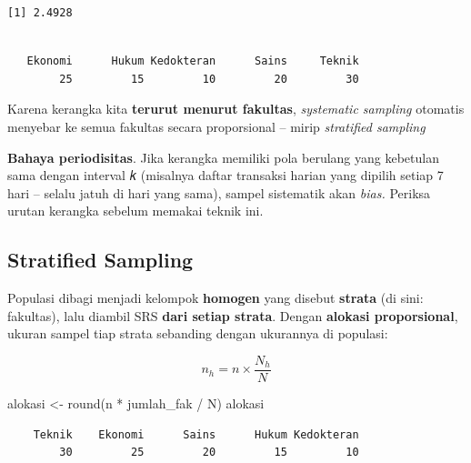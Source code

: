 \documentclass[
  indonesian,
  letterpaper,
]{book}
\newenvironment{Shaded}{\begin{snugshade}}{\end{snugshade}}
\newcommand{\FunctionTok}[1]{\textcolor[rgb]{0.28,0.35,0.67}{#1}}
\newcommand{\NormalTok}[1]{\textcolor[rgb]{0.00,0.23,0.31}{#1}}
\newcommand{\OtherTok}[1]{\textcolor[rgb]{0.00,0.23,0.31}{#1}}
\newcommand{\SpecialCharTok}[1]{\textcolor[rgb]{0.37,0.37,0.37}{#1}}
\begin{document}
\begin{verbatim}
[1] 2.4928
\end{verbatim}

\begin{Shaded}
\end{Shaded}

\begin{verbatim}

   Ekonomi      Hukum Kedokteran      Sains     Teknik 
        25         15         10         20         30 
\end{verbatim}

Karena kerangka kita \textbf{terurut menurut fakultas}, \emph{systematic
sampling} otomatis menyebar ke semua fakultas secara proporsional --
mirip \emph{stratified sampling}

\textbf{Bahaya periodisitas}. Jika kerangka memiliki pola berulang yang
kebetulan sama dengan interval 𝑘 (misalnya daftar transaksi harian yang
dipilih setiap 7 hari -- selalu jatuh di hari yang sama), sampel
sistematik akan \emph{bias.} Periksa urutan kerangka sebelum memakai
teknik ini.

\subsection{Stratified Sampling}\label{stratified-sampling}

Populasi dibagi menjadi kelompok \textbf{homogen} yang disebut
\textbf{strata} (di sini: fakultas), lalu diambil SRS \textbf{dari
setiap strata}. Dengan \textbf{alokasi proporsional}, ukuran sampel tiap
strata sebanding dengan ukurannya di populasi:

\[n_h = n \times \frac{N_h}{N}\]

\begin{Shaded}
\begin{Highlighting}[]
\NormalTok{alokasi }\OtherTok{\textless{}{-}} \FunctionTok{round}\NormalTok{(n }\SpecialCharTok{*}\NormalTok{ jumlah\_fak }\SpecialCharTok{/}\NormalTok{ N)}
\NormalTok{alokasi}
\end{Highlighting}
\end{Shaded}

\begin{verbatim}
    Teknik    Ekonomi      Sains      Hukum Kedokteran 
        30         25         20         15         10 
\end{verbatim}
\end{document}
